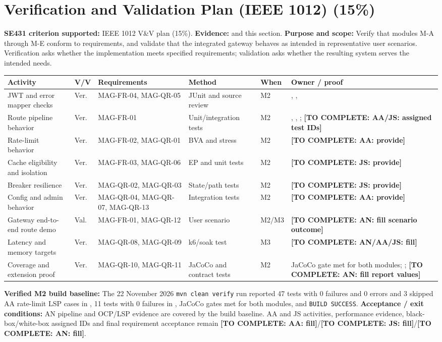 \documentclass[11pt,a4paper]{article}
\newcommand{\todo}[1]{\textcolor{red!70!black}{\textbf{[TO COMPLETE: #1]}}}
\begin{document}
\section{Verification and Validation Plan (IEEE 1012) (15\%)}\label{sec:vv}
\textbf{SE431 criterion supported:} IEEE 1012 V\&V plan (15\%). \textbf{Evidence:}  and this section.
\textbf{Purpose and scope:} Verify that modules M-A through M-E conform to requirements, and validate that the integrated gateway behaves as intended in representative user scenarios. Verification asks whether the implementation meets specified requirements; validation asks whether the resulting system serves the intended needs.
\begin{longtable}{L{3.2cm} L{1.0cm} L{2.4cm} L{2.2cm} L{1.3cm} L{2.1cm}}\toprule
\textbf{Activity} & \textbf{V/V} & \textbf{Requirements} & \textbf{Method} & \textbf{When} & \textbf{Owner / proof}\\\midrule\endhead
JWT and error mapper checks & Ver. & MAG-FR-04, MAG-QR-05 & JUnit and source review & M2 & , , \\
Route pipeline behavior & Ver. & MAG-FR-01 & Unit/integration tests & M2 & , , ; \todo{AA/JS: assigned test IDs}\\
Rate-limit behavior & Ver. & MAG-FR-02, MAG-QR-01 & BVA and stress & M2 & \todo{AA: provide}\\
Cache eligibility and isolation & Ver. & MAG-FR-03, MAG-QR-06 & EP and unit tests & M2 & \todo{JS: provide}\\
Breaker resilience & Ver. & MAG-QR-02, MAG-QR-03 & State/path tests & M2 & \todo{JS: provide}\\
Config and admin behavior & Ver. & MAG-QR-04, MAG-QR-07, MAG-QR-13 & Integration tests & M2 & \todo{AA: provide}\\
Gateway end-to-end route demo & Val. & MAG-FR-01, MAG-QR-12 & User scenario & M2/M3 & \todo{AN: fill scenario outcome}\\
Latency and memory targets & Ver. & MAG-QR-08, MAG-QR-09 & k6/soak test & M3 & \todo{AN/AA/JS: fill}\\
Coverage and extension proof & Ver. & MAG-QR-10, MAG-QR-11 & JaCoCo and contract tests & M2 & JaCoCo gate met for both modules; ; \todo{AN: fill report values}\\\bottomrule\end{longtable}
\textbf{Verified M2 build baseline:} The 22 November 2026 \texttt{mvn clean verify} run reported 47 tests with 0 failures and 0 errors and 3 skipped AA rate-limit LSP cases in , 11 tests with 0 failures in , JaCoCo gates met for both modules, and \texttt{BUILD SUCCESS}.
\textbf{Acceptance / exit conditions:} AN pipeline and OCP/LSP evidence are covered by the build baseline. AA and JS activities, performance evidence, black-box/white-box assigned IDs and final requirement acceptance remain \todo{AA: fill}/\todo{JS: fill}/\todo{AN: fill}.
\end{document}
